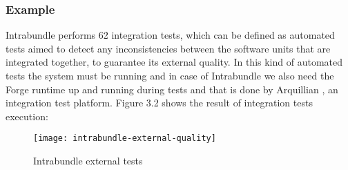 \subsubsection{Example}
Intrabundle performs 62 integration tests, which can be defined as automated tests aimed to detect any inconsistencies between the software units that are integrated together, to guarantee its external quality. In this kind of automated tests the system must be running and in case of Intrabundle we also need the Forge runtime up and running during tests and that is done by Arquillian \citep{dan 2011}, an integration test platform. Figure 3.2 shows the result of integration tests execution:

\begin{figure}[h]
\caption{Intrabundle external tests}
\texttt{[image: intrabundle-external-quality]}
\end{figure}

\FloatBarrier